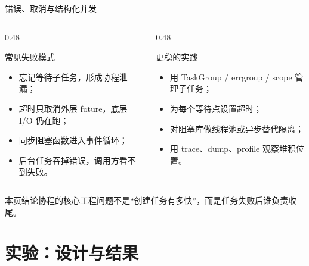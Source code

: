\documentclass[UTF8,aspectratio=169,11pt]{ctexbeamer}
\newcommand{\takeaway}[1]{\begin{block}{本页结论}#1\end{block}}
\begin{document}
\begin{frame}{错误、取消与结构化并发}
  \begin{columns}[T,totalwidth=\linewidth]
    \begin{column}{0.48\linewidth}
      \begin{block}{常见失败模式}
        \begin{itemize}
          \item 忘记等待子任务，形成协程泄漏；
          \item 超时只取消外层 future，底层 I/O 仍在跑；
          \item 同步阻塞函数进入事件循环；
          \item 后台任务吞掉错误，调用方看不到失败。
        \end{itemize}
      \end{block}
    \end{column}
    \begin{column}{0.48\linewidth}
      \begin{exampleblock}{更稳的实践}
        \begin{itemize}
          \item 用 TaskGroup / errgroup / scope 管理子任务；
          \item 为每个等待点设置超时；
          \item 对阻塞库做线程池或异步替代隔离；
          \item 用 trace、dump、profile 观察堆积位置。
        \end{itemize}
      \end{exampleblock}
    \end{column}
  \end{columns}
  \takeaway{协程的核心工程问题不是“创建任务有多快”，而是任务失败后谁负责收尾。}
\end{frame}

\section{实验：设计与结果}
\end{document}
